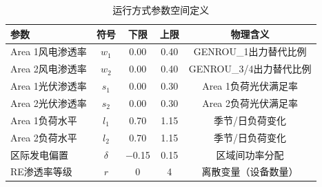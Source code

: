 \begin{table}[htbp]
\centering
\caption{运行方式参数空间定义}
\label{tab:mode_space}
\begin{tabular}{lcccc}
\toprule
参数 & 符号 & 下限 & 上限 & 物理含义 \\
\midrule
Area 1风电渗透率 & $w_1$ & 0.00 & 0.40 & GENROU\_1出力替代比例 \\
Area 2风电渗透率 & $w_2$ & 0.00 & 0.40 & GENROU\_3/4出力替代比例 \\
Area 1光伏渗透率 & $s_1$ & 0.00 & 0.30 & Area 1负荷光伏满足率 \\
Area 2光伏渗透率 & $s_2$ & 0.00 & 0.30 & Area 2负荷光伏满足率 \\
Area 1负荷水平 & $l_1$ & 0.70 & 1.15 & 季节/日负荷变化 \\
Area 2负荷水平 & $l_2$ & 0.70 & 1.15 & 季节/日负荷变化 \\
区际发电偏置 & $\delta$ & $-$0.15 & 0.15 & 区域间功率分配 \\
RE渗透率等级 & $r$ & 0 & 4 & 离散变量（设备数量） \\
\bottomrule
\end{tabular}
\end{table}
